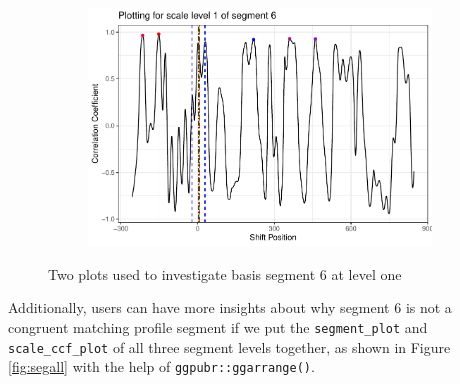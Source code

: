 \begin{figure}
\begin{subfigure}[t]{\textwidth}
\begin{adjustbox}{valign=t}
\begin{minipage}{.39\textwidth}
{\small {}
\begin{Schunk}
\end{Schunk}
}
\vspace{1em}
\end{minipage}
\begin{minipage}{.59\textwidth}
\includegraphics[width=\textwidth]{ju-hofmann_files/figure-latex/segplot2-1.pdf}
\end{minipage}
\end{adjustbox}
\end{subfigure}
\caption{\label{fig:segplots} Two plots used to investigate basis segment 6 at level one}
\end{figure}

Additionally, users can have more insights about why segment 6 is not a
congruent matching profile segment if we put the \texttt{segment\_plot}
and \texttt{scale\_ccf\_plot} of all three segment levels together, as
shown in Figure \ref{fig:segall} with the help of
\texttt{ggpubr::ggarrange()}.

